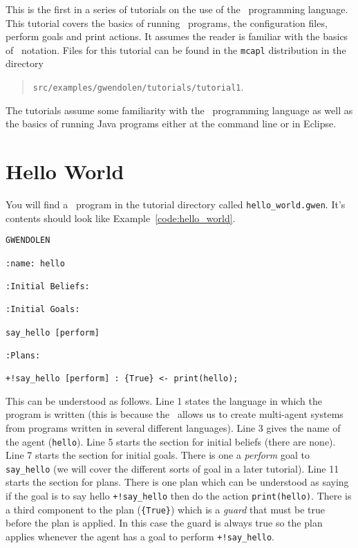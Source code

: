 
This is the first in a series of tutorials on the use of the \gwendolen\ programming language.  This tutorial covers the basics of running \gwendolen\ programs, the configuration files, perform goals and print actions.  It assumes the reader is familiar with the basics of \prolog\ notation.
Files for this tutorial can be found in the
\texttt{mcapl} distribution in the directory
\begin{quote}
\texttt{src/examples/gwendolen/tutorials/tutorial1}.
\end{quote}
%
The tutorials assume some familiarity with the \prolog\ programming language as well as the basics of running Java programs either at the command line or in Eclipse.

\section{Hello World}

You will find a \gwendolen\ program in the tutorial directory called \texttt{hello\_world.gwen}.  It's contents should look like Example~\ref{code:hello_world}.
\begin{ourexample}
\label{code:hello_world}
\begin{lstlisting}[basicstyle=\footnotesize\sffamily,language=Gwendolen]
GWENDOLEN

:name: hello

:Initial Beliefs:

:Initial Goals:

say_hello [perform]

:Plans:

+!say_hello [perform] : {True} <- print(hello);
\end{lstlisting}
\end{ourexample}

This can be understood as follows.  Line 1 states the language in which the program is written (this is because the \ail\ allows us to create multi-agent systems from programs written in several different languages).  Line 3 gives the name of the agent (\lstinline{hello}).  Line 5 starts the section for initial beliefs (there are none).  Line 7 starts the section for initial goals.  There is one a \emph{perform} goal to \lstinline{say_hello} (we will cover the different sorts of goal in a later tutorial).  Line 11 starts the section for plans.  There is one plan which can be understood as saying if the goal is to say hello \lstinline{+!say_hello} then do the action \lstinline{print(hello)}.  There is a third component to the plan (\lstinline+{True}+) which is a \emph{guard} that must be true before the plan is applied.  In this case the guard is always true so the plan applies whenever the agent has a goal to perform \lstinline{+!say_hello}.

